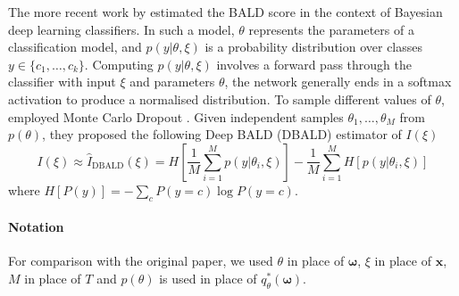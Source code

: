 \documentclass[a4paper, 10pt]{report}
\theoremstyle{plain}
\begin{document}
	The more recent work by \citet{gal2017deep} estimated the BALD score in the context of Bayesian deep learning classifiers.
	In such a model, $\theta$ represents the parameters of a classification model, and $p(y|\theta,\xi)$ is a probability distribution over classes $y\in\{c_1,\dots,c_k\}$. 
	Computing $p(y|\theta,\xi)$ involves a forward pass through the classifier with input $\xi$ and parameters $\theta$, the network generally ends in a softmax activation to produce a normalised distribution.
	To sample different values of $\theta$, \citet{gal2017deep} employed Monte Carlo Dropout \citep{gal2016dropout}.
	Given independent samples $\theta_1,\dots,\theta_M$ from $p(\theta)$, they proposed the following Deep BALD (DBALD) estimator of $I(\xi)$
	\begin{equation}
	I(\xi) \approx \hat{I}_\text{DBALD}(\xi) = H\left[ \frac{1}{M}\sum_{i=1}^M p(y|\theta_i,\xi) \right] - \frac{1}{M} \sum_{i=1}^M H[p(y|\theta_i,\xi)]
	\end{equation}
	where $H[P(y)] = -\sum_c P(y=c)\log P(y=c)$.
	
	\paragraph{Notation} For comparison with the original paper, we used $\theta$ in place of $\bm{\omega}$, $\xi$ in place of $\mathbf{x}$, $M$ in place of $T$ and $p(\theta)$ is used in place of $q^*_\theta(\bm{\omega})$.
	
\end{document}

